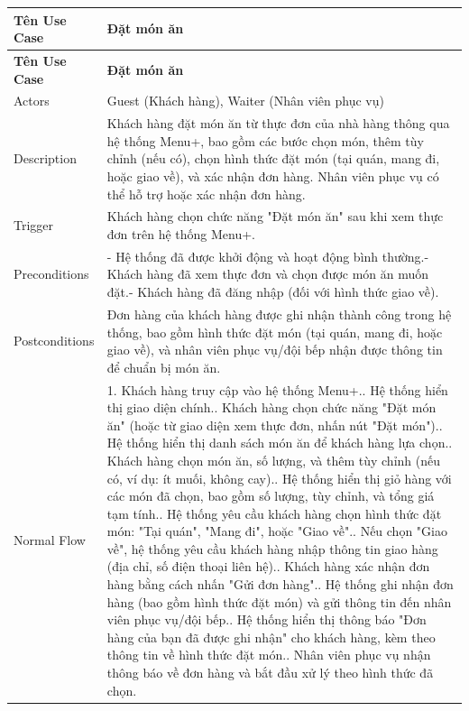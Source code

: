 \begin{itemize}
        \begin{longtable}{|p{3cm}|p{12cm}|}
        \hline
        \textbf{Tên Use Case} & \textbf{Đặt món ăn} \\ 
        \hline
        \endfirsthead
        \hline
        \textbf{Tên Use Case} & \textbf{Đặt món ăn} \\ 
        \endhead
        \hline
        \endfoot
        \hline
        \endlastfoot
        Actors & Guest (Khách hàng), Waiter (Nhân viên phục vụ) \\ 
        \hline
        Description & Khách hàng đặt món ăn từ thực đơn của nhà hàng thông qua hệ thống Menu+, bao gồm các bước chọn món, thêm tùy chỉnh (nếu có), chọn hình thức đặt món (tại quán, mang đi, hoặc giao về), và xác nhận đơn hàng. Nhân viên phục vụ có thể hỗ trợ hoặc xác nhận đơn hàng. \\
        \hline
        Trigger & Khách hàng chọn chức năng "Đặt món ăn" sau khi xem thực đơn trên hệ thống Menu+. \\
        \hline
        Preconditions & - Hệ thống đã được khởi động và hoạt động bình thường.\newline- Khách hàng đã xem thực đơn và chọn được món ăn muốn đặt.\newline- Khách hàng đã đăng nhập (đối với hình thức giao về). \\
        \hline
        Postconditions & Đơn hàng của khách hàng được ghi nhận thành công trong hệ thống, bao gồm hình thức đặt món (tại quán, mang đi, hoặc giao về), và nhân viên phục vụ/đội bếp nhận được thông tin để chuẩn bị món ăn. \\
        \hline
        Normal Flow & 1. Khách hàng truy cập vào hệ thống Menu+.\newline2. Hệ thống hiển thị giao diện chính.\newline3. Khách hàng chọn chức năng "Đặt món ăn" (hoặc từ giao diện xem thực đơn, nhấn nút "Đặt món").\newline4. Hệ thống hiển thị danh sách món ăn để khách hàng lựa chọn.\newline5. Khách hàng chọn món ăn, số lượng, và thêm tùy chỉnh (nếu có, ví dụ: ít muối, không cay).\newline6. Hệ thống hiển thị giỏ hàng với các món đã chọn, bao gồm số lượng, tùy chỉnh, và tổng giá tạm tính.\newline7. Hệ thống yêu cầu khách hàng chọn hình thức đặt món: "Tại quán", "Mang đi", hoặc "Giao về".\newline8. Nếu chọn "Giao về", hệ thống yêu cầu khách hàng nhập thông tin giao hàng (địa chỉ, số điện thoại liên hệ).\newline9. Khách hàng xác nhận đơn hàng bằng cách nhấn "Gửi đơn hàng".\newline10. Hệ thống ghi nhận đơn hàng (bao gồm hình thức đặt món) và gửi thông tin đến nhân viên phục vụ/đội bếp.\newline11. Hệ thống hiển thị thông báo "Đơn hàng của bạn đã được ghi nhận" cho khách hàng, kèm theo thông tin về hình thức đặt món.\newline12. Nhân viên phục vụ nhận thông báo về đơn hàng và bắt đầu xử lý theo hình thức đã chọn. \\

\end{longtable}
\end{itemize}
